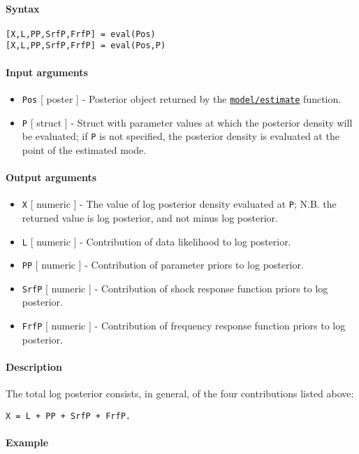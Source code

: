 


	\paragraph{Syntax}\label{syntax}

\begin{verbatim}
[X,L,PP,SrfP,FrfP] = eval(Pos)
[X,L,PP,SrfP,FrfP] = eval(Pos,P)
\end{verbatim}

\paragraph{Input arguments}\label{input-arguments}

\begin{itemize}
\item
  \texttt{Pos} {[} poster {]} - Posterior object returned by the
  \href{model/estimate}{\texttt{model/estimate}} function.
\item
  \texttt{P} {[} struct {]} - Struct with parameter values at which the
  posterior density will be evaluated; if \texttt{P} is not specified,
  the posterior density is evaluated at the point of the estimated mode.
\end{itemize}

\paragraph{Output arguments}\label{output-arguments}

\begin{itemize}
\item
  \texttt{X} {[} numeric {]} - The value of log posterior density
  evaluated at \texttt{P}; N.B. the returned value is log posterior, and
  not minus log posterior.
\item
  \texttt{L} {[} numeric {]} - Contribution of data likelihood to log
  posterior.
\item
  \texttt{PP} {[} numeric {]} - Contribution of parameter priors to log
  posterior.
\item
  \texttt{SrfP} {[} numeric {]} - Contribution of shock response
  function priors to log posterior.
\item
  \texttt{FrfP} {[} numeric {]} - Contribution of frequency response
  function priors to log posterior.
\end{itemize}

\paragraph{Description}\label{description}

The total log posterior consists, in general, of the four contributions
listed above:

\begin{verbatim}
X = L + PP + SrfP + FrfP.
\end{verbatim}

\paragraph{Example}\label{example}


